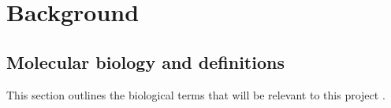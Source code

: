 \documentclass[12pt, twoside, a4paper]{report}
\begin{document}


\chapter{Background}






\section{Molecular biology and definitions} \label{bg:bio}
This section outlines the biological terms that will be relevant to this project \cite{RefWorks:106, RefWorks:108, RefWorks:110, RefWorks:111}.
\end{document}
